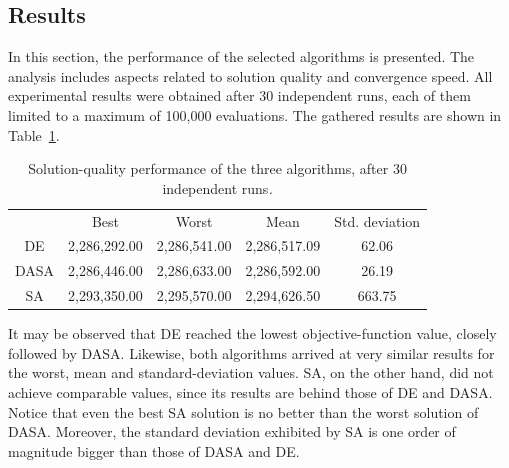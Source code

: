 \subsection{Results \label{sub:07-Results}}

In this section, the performance of the selected algorithms is presented.
The analysis includes aspects related to solution quality and convergence
speed. All experimental results were obtained after 30 independent
runs, each of them limited to a maximum of 100,000 evaluations. The
gathered results are shown in Table~\ref{tab:07-Algorithm_performance}.

\begin{table}
\centering

\caption{Solution-quality performance of the three algorithms, after 30 independent
runs\textit{\emph{.}}\textit{\label{tab:07-Algorithm_performance}}}


\begin{tabular}{ccccc}
\toprule 
 & Best & Worst & Mean & Std. deviation\tabularnewline\addlinespace
\midrule
DE & 2,286,292.00 & 2,286,541.00 & 2,286,517.09 & 62.06\tabularnewline
DASA & 2,286,446.00 & 2,286,633.00 & 2,286,592.00 & 26.19\tabularnewline
SA  & 2,293,350.00 & 2,295,570.00 & 2,294,626.50 & 663.75\tabularnewline
\bottomrule
\end{tabular}
\end{table}


It may be observed that DE reached the lowest objective-function value,
closely followed by DASA. Likewise, both algorithms arrived at very
similar results for the worst, mean and standard-deviation values.
SA, on the other hand, did not achieve comparable values, since its
results are behind those of DE and DASA. Notice that even the best
SA solution is no better than the worst solution of DASA. Moreover,
the standard deviation exhibited by SA is one order of magnitude bigger
than those of DASA and DE.


